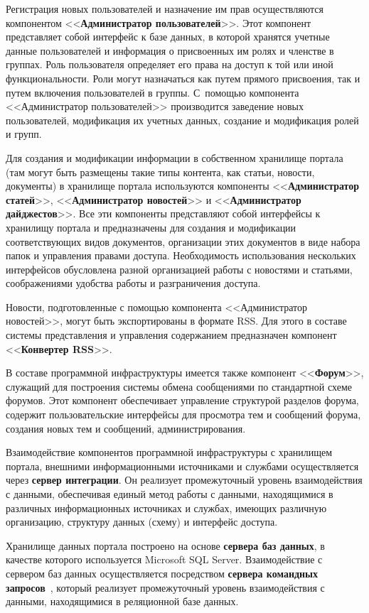 \begin{multicols}{2}
 Регистрация новых пользователей и назначение им прав осуществляются
компонентом <<\textbf{Администратор пользователей}>>. Этот компонент представляет
собой интерфейс к базе данных, в которой хранятся учетные данные пользователей и
информация о присвоенных им ролях и членстве в группах. Роль пользователя определяет
его права на доступ к той или иной функциональности. Роли могут назначаться как путем
прямого присвоения, так и путем включения пользователей в группы. С~по\-мощью
компонента <<Администратор пользователей>> производится заведение новых
пользователей, модификация их учетных данных, создание и модификация ролей и групп.

 Для создания и модификации информации в собственном хранилище портала (там
могут быть размещены такие типы контента, как статьи, новости, документы) в
хранилище портала используются компоненты <<\textbf{Администратор статей}>>,
<<\textbf{Администратор новостей}>> и <<\textbf{Администратор дайджестов}>>. Все
эти компоненты представляют собой интерфейсы к хранилищу портала и предназначены
для создания и модификации соответствующих видов документов, организации этих
документов в виде набора папок и управления правами доступа. Необходимость
использования нескольких интерфейсов обусловлена разной организацией работы с
новостями и статьями, соображениями удобства работы и разграничения доступа.

 Новости, подготовленные с помощью компонента <<Администратор новостей>>,
могут быть экспортированы в формате RSS. Для этого в составе системы представления и
управления содержанием предназначен компонент <<\textbf{Конвертер RSS}>>.

 В составе программной инфраструктуры име\-ет\-ся также компонент
<<\textbf{Форум}>>, служащий для постро\-ения системы обмена сообщениями по
стандартной схеме форумов. Этот компонент обеспечивает управление структурой
разделов форума, содержит пользовательские интерфейсы для просмотра тем и
сообщений форума, создания новых тем и сообщений, администрирования.

 Взаимодействие компонентов программной инфраструктуры с хранилищем
портала, внешними информационными источниками и службами осуществляется через
\textbf{сервер интеграции}. Он реализует промежуточный уровень взаимодействия с
данными, обеспечивая единый метод работы с данными, находящимися в различных
информационных источниках и службах, имеющих различную организацию, структуру
данных (схему) и интерфейс доступа.

 Хранилище данных портала построено на основе \textbf{сервера баз данных}, в
качестве которого исполь\-зуется Microsoft SQL Server. Взаимодействие с сервером баз
данных осуществляется посредством \textbf{сервера командных запросов}~\cite{7bos},
который реализует промежуточный уровень взаимодействия с данными, находящимися в
реляционной базе данных.


\end{multicols}
